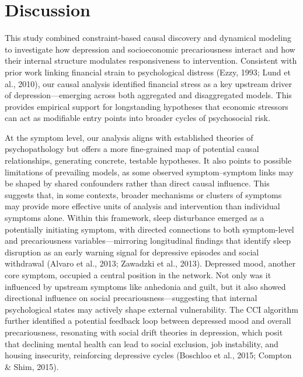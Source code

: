 \documentclass[
]{article}
\begin{document}
\section{Discussion}\label{discussion}

This study combined constraint-based causal discovery and dynamical
modeling to investigate how depression and socioeconomic precariousness
interact and how their internal structure modulates responsiveness to
intervention. Consistent with prior work linking financial strain to
psychological distress (Ezzy, 1993; Lund et al., 2010), our causal
analysis identified financial stress as a key upstream driver of
depression---emerging across both aggregated and disaggregated models.
This provides empirical support for longstanding hypotheses that
economic stressors can act as modifiable entry points into broader
cycles of psychosocial risk.

At the symptom level, our analysis aligns with established theories of
psychopathology but offers a more fine-grained map of potential causal
relationships, generating concrete, testable hypotheses. It also points
to possible limitations of prevailing models, as some observed
symptom--symptom links may be shaped by shared confounders rather than
direct causal influence. This suggests that, in some contexts, broader
mechanisms or clusters of symptoms may provide more effective units of
analysis and intervention than individual symptoms alone. Within this
framework, sleep disturbance emerged as a potentially initiating
symptom, with directed connections to both symptom-level and
precariousness variables---mirroring longitudinal findings that identify
sleep disruption as an early warning signal for depressive episodes and
social withdrawal (Alvaro et al., 2013; Zawadzki et al., 2013).
Depressed mood, another core symptom, occupied a central position in the
network. Not only was it influenced by upstream symptoms like anhedonia
and guilt, but it also showed directional influence on social
precariousness---suggesting that internal psychological states may
actively shape external vulnerability. The CCI algorithm further
identified a potential feedback loop between depressed mood and overall
precariousness, resonating with social drift theories in depression,
which posit that declining mental health can lead to social exclusion,
job instability, and housing insecurity, reinforcing depressive cycles
(Boschloo et al., 2015; Compton \& Shim, 2015).
\end{document}
